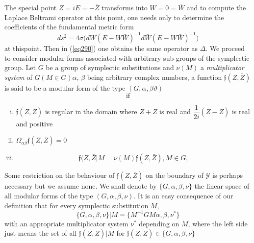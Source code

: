 The special point $Z = i E = - \bar{Z}$ transforms into $W = 0 =
\bar{W}$ and to compute the Laplace Beltrami operator at this point,
one needs only to determine the coefficients of the fundamental metric
form  
$$
ds^2 = 4 \sigma \bigg(d W (E - W \bar{W})^{-1} d \bar{W} (E - W
\bar{W})^{-1}\bigg) 
$$
at this\pageoriginale point. Then in (\ref{eq290}) one obtains the
same operator as 
$\Delta$. We proceed to consider modular forms associated with
arbitrary sub-groups of the symplectic group. Let $G$ be a group of
symplectic substitutions and $\nu(M)$ a \textit{multiplicator system}
of $G(M \in G) \alpha$, $\beta$ being arbitrary complex numbers, a
function $\mathfrak{f} (Z, \bar{Z})$ is said to be a modular form of
the type $(G, \alpha, \beta \vartheta )$ 
$$
\text{ if }
$$
\begin{enumerate}[(i)]
\item $\mathfrak{f} (Z, \bar{Z})$ is regular in the domain where $Z +
  \bar{Z}$ is real and $\dfrac{1}{2 i} (Z - \bar{Z})$ is real and
  positive 
\item $\Omega_{\alpha \beta} \mathfrak{f} (Z, \bar{Z})= 0$ 
\item 
\begin{equation*}
 \mathfrak{f} (Z , \bar{Z} | M = \nu (M)
  \mathfrak{f} (Z, \bar{Z}), M \in G,  \tag{292}\label{eq292}     
\end{equation*} 
\end{enumerate}

Some restriction on the behaviour of $\mathfrak{f}(Z, \bar{Z})$ on the
boundary of $\mathscr{Y}$ is perhaps necessary but we assume none. We
shall denote by $\{ G, \alpha, \beta, \nu \}$ the linear space of all
modular forms of the type $(G, \alpha, \beta, \nu)$. It is an easy
consequence of our definition that for every symplectic substitution
$M$, 
\begin{equation*}
\{ G, \alpha, \beta, \nu \} |  M = \{ M^{-1} G M  \alpha, \beta, \nu^*
\}\tag{293}\label{eq293}     
\end{equation*}
with an appropriate multiplicator system $\nu^{*}$ depending on $M$,
where the left side just means the set of all $\mathfrak{f} (Z,
\bar{Z}) | M$ for $\mathfrak{f} (Z, \bar{Z}) \in \{ G, \alpha, \beta,
\nu \}$ 

